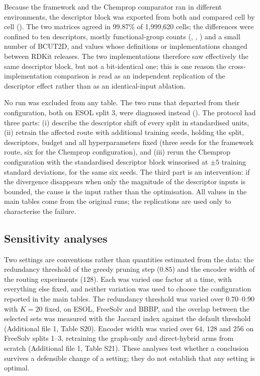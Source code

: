Because the framework and the Chemprop comparator ran in different environments, the descriptor block was exported from both and compared cell by cell (). The two matrices agreed in 99.87\% of 1{,}999{,}620 cells; the differences were confined to ten descriptors, mostly functional-group counts (, , ) and a small number of BCUT2D,  and  values whose definitions or implementations changed between RDKit releases. The two implementations therefore saw effectively the same descriptor block, but not a bit-identical one; this is one reason the cross-implementation comparison is read as an independent replication of the descriptor effect rather than as an identical-input ablation.

No run was excluded from any table. The two runs that departed from their configuration, both on ESOL split 3, were diagnosed instead (). The protocol had three parts: (i) describe the descriptor shift of every split in standardised units, (ii) retrain the affected route with additional training seeds, holding the split, descriptors, budget and all hyperparameters fixed (three seeds for the framework route, six for the Chemprop configuration), and (iii) rerun the Chemprop configuration with the standardised descriptor block winsorised at $\pm5$ training standard deviations, for the same six seeds. The third part is an intervention: if the divergence disappears when only the magnitude of the descriptor inputs is bounded, the cause is the input rather than the optimisation. All values in the main tables come from the original runs; the replications are used only to characterise the failure.

\subsection{Sensitivity analyses}\label{subsec:sensitivity}

Two settings are conventions rather than quantities estimated from the data: the redundancy threshold of the greedy pruning step ($0.85$) and the encoder width of the routing experiments ($128$). Each was varied one factor at a time, with everything else fixed, and neither variation was used to choose the configuration reported in the main tables. The redundancy threshold was varied over $0.70$--$0.90$ with $K=20$ fixed, on ESOL, FreeSolv and BBBP, and the overlap between the selected sets was measured with the Jaccard index against the default threshold (Additional file 1, Table S20). Encoder width was varied over $64$, $128$ and $256$ on FreeSolv splits 1--3, retraining the graph-only and direct-hybrid arms from scratch (Additional file 1, Table S21). These analyses test whether a conclusion survives a defensible change of a setting; they do not establish that any setting is optimal.

